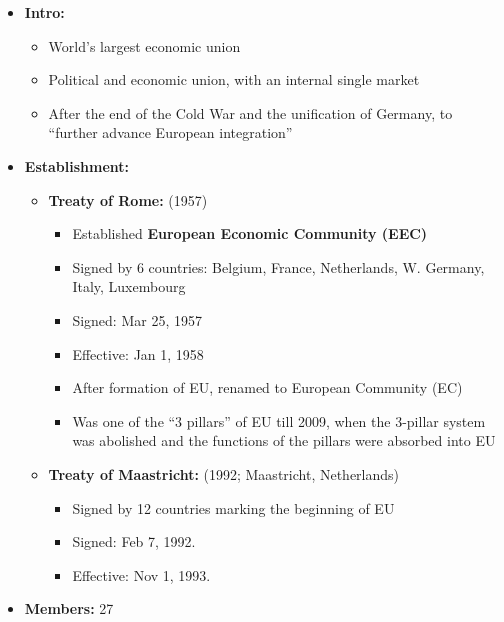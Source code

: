 \documentclass[
  12pt,
]{article}
\providecommand{\tightlist}{%
  \setlength{\itemsep}{0pt}\setlength{\parskip}{0pt}}
\begin{document}
\begin{itemize}
\tightlist
\item
  \textbf{Intro:}

  \begin{itemize}
  \tightlist
  \item
    World's largest economic union
  \item
    Political and economic union, with an internal single market
  \item
    After the end of the Cold War and the unification of Germany, to
    ``further advance European integration''
  \end{itemize}
\item
  \textbf{Establishment:}

  \begin{itemize}
  \tightlist
  \item
    \textbf{Treaty of Rome:} (1957)

    \begin{itemize}
    \tightlist
    \item
      Established \textbf{European Economic Community (EEC)}
    \item
      Signed by 6 countries: Belgium, France, Netherlands, W. Germany,
      Italy, Luxembourg
    \item
      Signed: Mar 25, 1957
    \item
      Effective: Jan 1, 1958
    \item
      After formation of EU, renamed to European Community (EC)
    \item
      Was one of the ``3 pillars'' of EU till 2009, when the 3-pillar
      system was abolished and the functions of the pillars were
      absorbed into EU
    \end{itemize}
  \item
    \textbf{Treaty of Maastricht:} (1992; Maastricht, Netherlands)

    \begin{itemize}
    \tightlist
    \item
      Signed by 12 countries marking the beginning of EU
    \item
      Signed: Feb 7, 1992.
    \item
      Effective: Nov 1, 1993.
    \end{itemize}
  \end{itemize}
\item
  \textbf{Members:} 27
\end{itemize}
\end{document}
